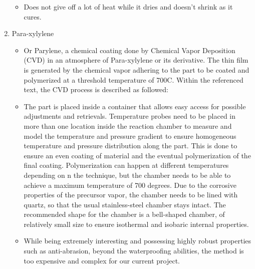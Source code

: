 \begin{enumerate}
\begin{itemize}
              \item Does not give off a lot of heat while it dries and doesn't shrink as it cures.
          \end{itemize}
    \item Para-xylylene
          \begin{itemize}
              \item Or Parylene, a chemical coating done by Chemical Vapor Deposition (CVD) in an atmosphere of Para-xylylene or its derivative. The thin film is generated by the chemical vapor adhering to the part to be coated and polymerized at a threshold temperature of 700C. Within the referenced text, the CVD process is described as followed:
              \item The part is placed inside a container that allows easy access for possible adjustments and retrievals. Temperature probes need to be placed in more than one location inside the reaction chamber to measure and model the temperature and pressure gradient to ensure homogeneous temperature and pressure distribution along the part. This is done to ensure an even coating of material and the eventual polymerization of the final coating. Polymerization can happen at different temperatures depending on n the technique, but the chamber needs to be able to achieve a maximum temperature of 700 degrees. Due to the corrosive properties of the precursor vapor, the chamber needs to be lined with quartz, so that the usual stainless-steel chamber stays intact. The recommended shape for the chamber is a bell-shaped chamber, of relatively small size to ensure isothermal and isobaric internal properties.
              \item While being extremely interesting and possessing highly robust properties such as anti-abrasion, beyond the waterproofing abilities, the method is too expensive and complex for our current project.


\end{itemize}
\end{enumerate}
